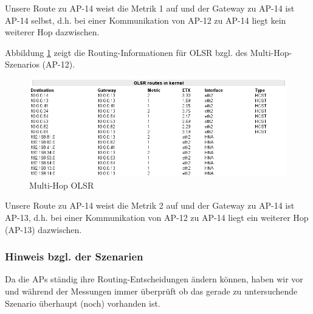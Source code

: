 \documentclass[a4paper,10pt]{article}
\begin{document}
Unsere Route zu AP-14 weist die Metrik 1 auf und der Gateway zu AP-14 ist AP-14 selbst, d.h. bei einer Kommunikation von AP-12 zu AP-14 liegt kein weiterer Hop dazwischen.

Abbildung \ref{2hop_olsr} zeigt die Routing-Informationen für OLSR bzgl. des Multi-Hop-Szenarios (AP-12).

\begin{center}
  \begin{figure}[thb]
    \includegraphics[width=1\textwidth]{2hop_olsr.png}
    \caption{Multi-Hop OLSR}
    \label{2hop_olsr}
  \end{figure}
\end{center}

Unsere Route zu AP-14 weist die Metrik 2 auf und der Gateway zu AP-14 ist AP-13, d.h. bei einer Kommunikation von AP-12 zu AP-14 liegt ein weiterer Hop (AP-13) dazwischen.

\subsubsection*{Hinweis bzgl. der Szenarien}

Da die APs ständig ihre Routing-Entscheidungen ändern können,
haben wir vor und während der Messungen immer überprüft ob das gerade zu untersuchende Szenario überhaupt (noch) vorhanden ist.

%
%
%
%
%
%
%
%
\end{document}
